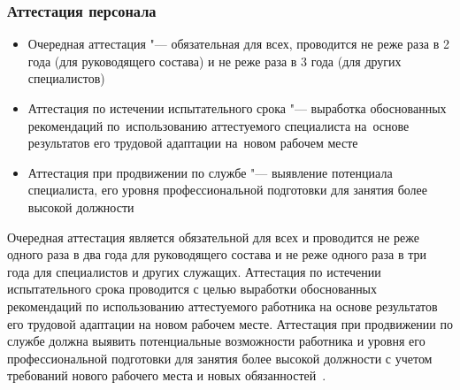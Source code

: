 \documentclass{../industrial-development}
\begin{document}
\begin{frame} \frametitle{Аттестация персонала}
  \begin{itemize}
	\item \alert{Очередная аттестация} "---  обязательная для всех, проводится не реже раза в 2 года (для руководящего состава) и не реже раза в 3 года (для других специалистов)

\item \alert{Аттестация по истечении испытательного срока} "---  выработка обоснованных рекомендаций по~использованию аттестуемого специалиста на~основе результатов его трудовой адаптации на~новом рабочем месте

\item \alert{Аттестация при продвижении по службе} "---  выявление потенциала специалиста, его уровня профессиональной подготовки для занятия более высокой должности
  \end{itemize}
\end{frame}

\lecturenotes

\alert{Очередная аттестация} является обязательной для всех и проводится не реже одного раза в два года для руководящего состава и не реже одного раза в три года для специалистов и других служащих. \alert{Аттестация по истечении испытательного срока} проводится с целью выработки обоснованных рекомендаций по использованию аттестуемого работника на основе результатов его трудовой адаптации на новом рабочем месте. \alert{Аттестация при продвижении по службе} должна выявить потенциальные возможности работника и уровня его профессиональной подготовки для занятия более высокой должности с учетом требований нового рабочего места и новых обязанностей~\cite[с.~419--420]{Kibanov}.
\end{document}
